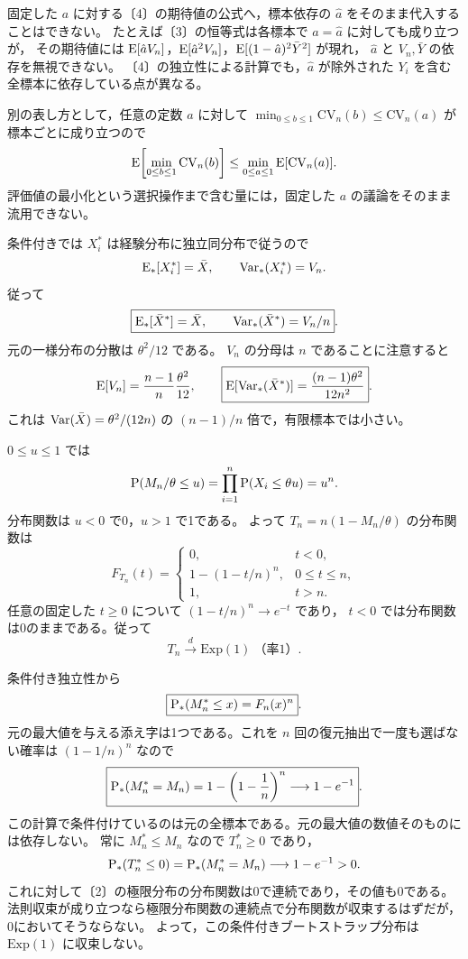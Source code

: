 \documentclass[a4paper,11pt]{ltjsarticle}
\begin{document}
固定した $a$ に対する〔4〕の期待値の公式へ，標本依存の $\hat a$ をそのまま代入することはできない。
たとえば〔3〕の恒等式は各標本で $a=\hat a$ に対しても成り立つが，
その期待値には $\operatorname{E}[\hat a V_n]$，$\operatorname{E}[\hat a^2 V_n]$，$\operatorname{E}[(1-\hat a)^2\bar Y^2]$ が現れ，
$\hat a$ と $V_n,\bar Y$ の依存を無視できない。
〔4〕の独立性による計算でも，$\hat a$ が除外された $Y_i$ を含む全標本に依存している点が異なる。

別の表し方として，任意の定数 $a$ に対して
$\min_{0\leq b\leq1}\mathrm{CV}_n(b)\leq\mathrm{CV}_n(a)$ が標本ごとに成り立つので
\[
\operatorname{E}\!\left[\min_{0\leq b\leq1}\mathrm{CV}_n(b)\right]
\leq\min_{0\leq a\leq1}\operatorname{E}[\mathrm{CV}_n(a)].
\]
評価値の最小化という選択操作まで含む量には，固定した $a$ の議論をそのまま流用できない。
\newpage

条件付きでは $X_i^*$ は経験分布に独立同分布で従うので
\[
\operatorname{E}_*[X_i^*]=\bar X,\qquad \operatorname{Var}_*(X_i^*)=V_n.
\]
従って
\[
\boxed{\operatorname{E}_*[\bar X^*]=\bar X,\qquad\operatorname{Var}_*(\bar X^*)=V_n/n}.
\]
元の一様分布の分散は $\theta^2/12$ である。
$V_n$ の分母は $n$ であることに注意すると
\[
\operatorname{E}[V_n]=\frac{n-1}{n}\frac{\theta^2}{12},\qquad
\boxed{\operatorname{E}[\operatorname{Var}_*(\bar X^*)]=\frac{(n-1)\theta^2}{12n^2}}.
\]
これは $\operatorname{Var}(\bar X)=\theta^2/(12n)$ の $(n-1)/n$ 倍で，有限標本では小さい。

$0\leq u\leq1$ では
\[
\operatorname{P}(M_n/\theta\leq u)
=\prod_{i=1}^n\operatorname{P}(X_i\leq\theta u)=u^n.
\]
分布関数は $u<0$ で0，$u>1$ で1である。
よって $T_n=n(1-M_n/\theta)$ の分布関数は
\[
\boxed{F_{T_n}(t)=
\begin{cases}
0,&t<0,\\
1-(1-t/n)^n,&0\leq t\leq n,\\
1,&t>n.
\end{cases}}
\]
任意の固定した $t\geq0$ について $(1-t/n)^n\to e^{-t}$ であり，
$t<0$ では分布関数は0のままである。従って
\[
\boxed{T_n\xrightarrow{d}\mathrm{Exp}(1)\ \text{（率1）}}.
\]

条件付き独立性から
\[
\boxed{\operatorname{P}_*(M_n^*\leq x)=F_n(x)^n}.
\]
元の最大値を与える添え字は1つである。これを $n$ 回の復元抽出で一度も選ばない確率は
$(1-1/n)^n$ なので
\[
\boxed{\operatorname{P}_*(M_n^*=M_n)=1-\left(1-\frac1n\right)^n
\longrightarrow1-e^{-1}}.
\]
この計算で条件付けているのは元の全標本である。元の最大値の数値そのものには依存しない。
\newpage
{}
常に $M_n^*\leq M_n$ なので $T_n^*\geq0$ であり，
\[
\operatorname{P}_*(T_n^*\leq0)=\operatorname{P}_*(M_n^*=M_n)
\longrightarrow1-e^{-1}>0.
\]
これに対して〔2〕の極限分布の分布関数は0で連続であり，その値も0である。
法則収束が成り立つなら極限分布関数の連続点で分布関数が収束するはずだが，0においてそうならない。
よって，この条件付きブートストラップ分布は $\mathrm{Exp}(1)$ に収束しない。
\end{document}
